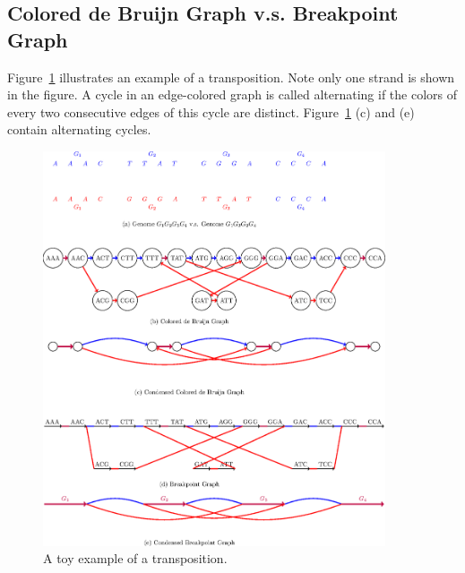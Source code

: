 \documentclass[12pt]{article}
\begin{document}
\newpage{}

\subsection{Colored de Bruijn Graph v.s. Breakpoint Graph}
Figure~\ref{transposition} illustrates an example of a transposition. Note only one strand is shown in the figure.
A cycle in an edge-colored graph is called alternating if the colors of every two consecutive edges of this cycle are distinct. 
Figure~\ref{transposition} (c) and (e) contain alternating cycles.
\begin{figure}[H]
\begin{center}
\includegraphics[width=0.9\textwidth]{transposition_new.eps}
\caption{A toy example of a transposition.}
\label{transposition}
\end{center}
\end{figure}

\newpage{}
\end{document}
